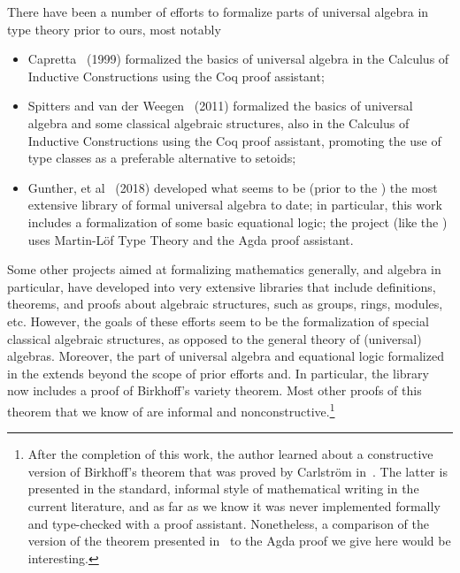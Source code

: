 \documentclass[a4paper,UKenglish,cleveref,autoref,thm-restate,11pt]{lipics-v2021}
\begin{document}
There have been a number of efforts to formalize parts of universal algebra in type theory prior to ours, most notably
\begin{itemize}
  \item Capretta~\cite{Capretta:1999} (1999) formalized the basics of universal algebra in the Calculus of Inductive Constructions using the Coq proof assistant;
    \item Spitters and van der Weegen~\cite{Spitters:2011} (2011) formalized the basics of universal algebra and some classical algebraic structures, also in the Calculus of Inductive Constructions using the Coq proof assistant, promoting the use of type classes as a preferable alternative to setoids;
 \item Gunther, et al~\cite{Gunther:2018} (2018) developed what seems to be (prior to the \ualib) the most extensive library of formal universal algebra to date; in particular, this work includes a formalization of some basic equational logic; the project (like the \ualib) uses Martin-L\"of Type Theory and the Agda proof assistant.
\end{itemize}
Some other projects aimed at formalizing mathematics generally, and algebra in particular, have developed into very extensive libraries that include definitions, theorems, and proofs about algebraic structures, such as groups, rings, modules, etc.  However, the goals of these efforts seem to be the formalization of special classical algebraic structures, as opposed to the general theory of (universal) algebras. Moreover, the part of universal algebra and equational logic formalized in the \ualib extends beyond the scope of prior efforts and. In particular, the library now includes a proof of Birkhoff's variety theorem.  Most other proofs of this theorem that we know of are informal and nonconstructive.\footnote{After the completion of this work, the author learned about a constructive version of Birkhoff's theorem that was proved by Carlstr\"om in~\cite{Carlstrom:2008}.  The latter is presented in the standard, informal style of mathematical writing in the current literature, and as far as we know it was never implemented formally and type-checked with a proof assistant. Nonetheless, a comparison of the version of the theorem presented in~\cite{Carlstrom:2008} to the Agda proof we give here would be interesting.}
\end{document}
